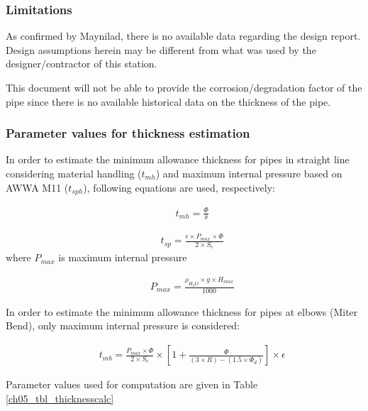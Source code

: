 \subsubsection{Limitations}
As confirmed by Maynilad, there is no available data regarding the design report. Design assumptions herein may be different from what was used by the designer/contractor of this station.

This document will not be able to provide the corrosion/degradation factor of the pipe since there is no available historical data on the thickness of the pipe.

\subsubsection{Parameter values for thickness estimation}
In order to estimate the minimum allowance thickness for pipes in straight line considering material handling ($t_{mh}$) and maximum internal pressure based on AWWA M11 ($t_{sph}$), following equations are used, respectively:

\begin{eqnarray}
&& t_{mh} = \frac{\Phi}{\delta} \label{ch05thickness01}
\end{eqnarray}

\begin{eqnarray}
&& t_{sp} = \frac{\epsilon\times P_{max} \times \Phi}{2 \times S_e} \label{ch05thickness02}
\end{eqnarray}
where $P_{max}$ is maximum internal pressure

\begin{eqnarray}
&& P_{max} = \frac{\rho_{H_2O} \times g \times H_{max}}{1000} \label{ch05thickness03}
\end{eqnarray}

In order to estimate the minimum allowance thickness for pipes at elbows (Miter Bend), only maximum internal pressure is considered:

\begin{eqnarray}
&& t_{mb} = \frac{P_{max} \times \Phi}{2 \times S_e} \times \left[ 1 + \frac{\Phi}{(3 \times R)-(1.5 \times \Phi_d)}\right]\times \epsilon \label{ch05thickness04}
\end{eqnarray}

Parameter values used for computation are given in Table \ref{ch05_tbl_thicknesscalc}

